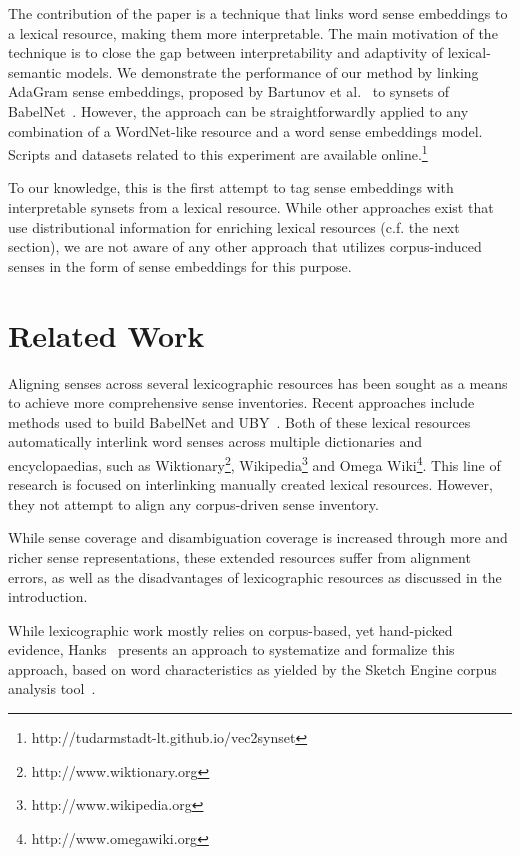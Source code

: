 \documentclass[10pt, a4paper]{article}
\begin{document}
The contribution of the paper is a technique that links word sense embeddings to a lexical resource, making them more interpretable. The main motivation of the technique is to close the gap between interpretability and adaptivity of lexical-semantic models. We demonstrate the performance of our method by linking AdaGram sense embeddings, proposed by Bartunov et  al.~ to synsets of BabelNet~\cite{navigli2010babelnet}. However, the approach can be straightforwardly applied to any combination of a WordNet-like resource and a word sense embeddings model. Scripts and datasets related to this experiment are available online.\footnote{http://tudarmstadt-lt.github.io/vec2synset}


 To our knowledge, this is the first attempt to tag sense embeddings with interpretable synsets from a lexical resource. While other approaches exist that use distributional information for enriching lexical resources  (c.f. the next section), we are not aware of any other approach that utilizes corpus-induced senses in the form of sense embeddings for this purpose. 
 
 
\section{Related Work}
\label{sec:rel}
Aligning senses across several lexicographic resources has been sought as a means to achieve more comprehensive sense inventories. Recent approaches include methods used to build BabelNet and UBY~\cite{gurevych2012uby}. Both of these lexical resources automatically interlink word senses across multiple dictionaries and encyclopaedias, such as Wiktionary\footnote{http://www.wiktionary.org}, Wikipedia\footnote{http://www.wikipedia.org} and Omega Wiki\footnote{http://www.omegawiki.org}.   This line of research is focused on interlinking manually created lexical resources. However, they not attempt to align any corpus-driven sense inventory. 

While sense coverage and disambiguation coverage is increased through more and richer sense representations, these extended resources suffer from alignment errors, as well as the disadvantages of lexicographic resources as discussed in the introduction.  

While lexicographic work mostly relies on corpus-based, yet hand-picked evidence, Hanks~ presents an approach to systematize and formalize this approach, based on word characteristics as yielded by the Sketch Engine corpus analysis tool~\cite{Kilgarriff2014}. 
\end{document}

